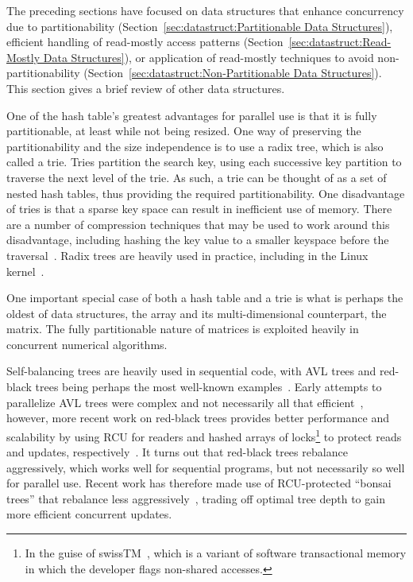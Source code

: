 The preceding sections have focused on data structures that enhance
concurrency due to partitionability
(Section~\ref{sec:datastruct:Partitionable Data Structures}),
efficient handling of read-mostly access patterns
(Section~\ref{sec:datastruct:Read-Mostly Data Structures}),
or application of read-mostly techniques to avoid
non-partitionability
(Section~\ref{sec:datastruct:Non-Partitionable Data Structures}).
This section gives a brief review of other data structures.

One of the hash table's greatest advantages for parallel use is that it
is fully partitionable, at least while not being resized.
One way of preserving the partitionability and the size independence is
to use a radix tree, which is also called a trie.
Tries partition the search key, using each successive key partition
to traverse the next level of the trie.
As such, a trie can be thought of as a set of nested hash tables,
thus providing the required partitionability.
One disadvantage of tries is that a sparse key space can result in
inefficient use of memory.
There are a number of compression techniques that may be used to
work around this disadvantage, including hashing the key value to
a smaller keyspace before the
traversal~\cite{RobertOlsson2007Trash}.
Radix trees are heavily used in practice, including in the Linux
kernel~\cite{NickPiggin2006radixtree}.

One important special case of both a hash table and a trie is what is
perhaps the oldest of data structures, the array and its multi-dimensional
counterpart, the matrix.
The fully partitionable nature of matrices is exploited heavily in
concurrent numerical algorithms.

Self-balancing trees are heavily used in sequential code, with
AVL trees and red-black trees being perhaps the most well-known
examples~\cite{ThomasHCorman2001Algorithms}.
Early attempts to parallelize AVL trees were complex and not necessarily
all that efficient~\cite{Ellis80},
however, more recent work on red-black trees provides better
performance and scalability by using RCU for readers and hashed arrays
of locks\footnote{
	In the guise of swissTM~\cite{AleksandarDragovejic2011STMnotToy},
	which is a variant of software transactional memory in which
	the developer flags non-shared accesses.}
to protect reads and updates,
respectively~\cite{PhilHoward2011RCUTMRBTree,PhilipWHoward2013RCUrbtree}.
It turns out that red-black trees rebalance aggressively, which works
well for sequential programs, but not necessarily so well for parallel
use.
Recent work has therefore made use of RCU-protected ``bonsai trees''
that rebalance less aggressively~\cite{AustinClements2012RCULinux:mmapsem},
trading off optimal tree depth to gain more efficient concurrent updates.

